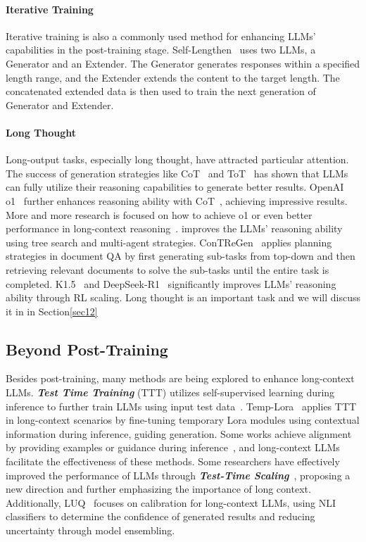 \paragraph{Iterative Training}
Iterative training is also a commonly used method for enhancing LLMs' capabilities in the post-training stage. Self-Lengthen~\citep{quan2024language} uses two LLMs, a Generator and an Extender. The Generator generates responses within a specified length range, and the Extender extends the content to the target length. The concatenated extended data is then used to train the next generation of Generator and Extender.
\paragraph{Long Thought}
Long-output tasks, especially long thought, have attracted particular attention. The success of generation strategies like CoT~\citep{wei2022chain} and ToT~\citep{yao2024tree} has shown that LLMs can fully utilize their reasoning capabilities to generate better results. OpenAI o1~\citep{OpenAI2024o1} further enhances reasoning ability with CoT~\citep{wei2022chain}, achieving impressive results. More and more research is focused on how to achieve o1 or even better performance in long-context reasoning~\citep{zeng2024scaling, team2025kimi, guo2025deepseekr1}. \citet{qin2024o1, huang2024o1} improves the LLMs' reasoning ability using tree search and multi-agent strategies. ConTReGen~\citep{roy2024contregen} applies planning strategies in document QA by first generating sub-tasks from top-down and then retrieving relevant documents to solve the sub-tasks until the entire task is completed. K1.5~\citep{team2025kimi} and DeepSeek-R1~\citep{guo2025deepseekr1} significantly improves LLMs' reasoning ability through RL scaling. Long thought is an important task and we will discuss it in \textbf{} in Section\ref{sec12}

\subsection{Beyond Post-Training}

Besides post-training, many methods are being explored to enhance long-context LLMs. \textbf{\textit{Test Time Training}} (TTT) utilizes self-supervised learning during inference to further train LLMs using input test data~\citep{sun2020test, liang2024comprehensive}. Temp-Lora~\citep{wang2024greater} applies TTT in long-context scenarios by fine-tuning temporary Lora modules using contextual information during inference, guiding generation. Some works achieve alignment by providing examples or guidance during inference~\citep{sun2024principle, zhang2024metaalign, xie2023defending}, and long-context LLMs facilitate the effectiveness of these methods. Some researchers have effectively improved the performance of LLMs through \textbf{\textit{Test-Time Scaling}}~\citep{liao2024beyond, snell2024scaling}, proposing a new direction and further emphasizing the importance of long context. Additionally, LUQ~\citep{zhang2024luq} focuses on calibration for long-context LLMs, using NLI classifiers to determine the confidence of generated results and reducing uncertainty through model ensembling.